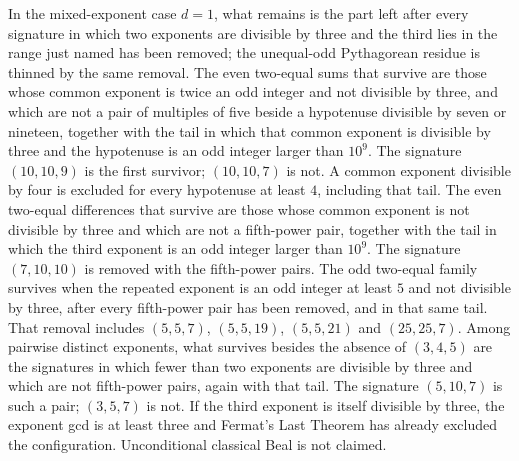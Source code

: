 \documentclass[a4paper]{article}
\theoremstyle{definition}
\theoremstyle{remark}
\begin{document}
In the mixed-exponent case \( d=1 \), what remains is the part left after every signature in which two exponents are divisible by three and the third lies in the range just named has been removed; the unequal-odd Pythagorean residue is thinned by the same removal. The even two-equal sums that survive are those whose common exponent is twice an odd integer and not divisible by three, and which are not a pair of multiples of five beside a hypotenuse divisible by seven or nineteen, together with the tail in which that common exponent is divisible by three and the hypotenuse is an odd integer larger than \( 10^9 \). The signature \( (10,10,9) \) is the first survivor; \( (10,10,7) \) is not. A common exponent divisible by four is excluded for every hypotenuse at least \( 4 \), including that tail. The even two-equal differences that survive are those whose common exponent is not divisible by three and which are not a fifth-power pair, together with the tail in which the third exponent is an odd integer larger than \( 10^9 \). The signature \( (7,10,10) \) is removed with the fifth-power pairs. The odd two-equal family survives when the repeated exponent is an odd integer at least \( 5 \) and not divisible by three, after every fifth-power pair has been removed, and in that same tail. That removal includes \( (5,5,7) \), \( (5,5,19) \), \( (5,5,21) \) and \( (25,25,7) \). Among pairwise distinct exponents, what survives besides the absence of \( (3,4,5) \) are the signatures in which fewer than two exponents are divisible by three and which are not fifth-power pairs, again with that tail. The signature \( (5,10,7) \) is such a pair; \( (3,5,7) \) is not. If the third exponent is itself divisible by three, the exponent gcd is at least three and Fermat's Last Theorem has already excluded the configuration. Unconditional classical Beal is not claimed.
\end{document}
